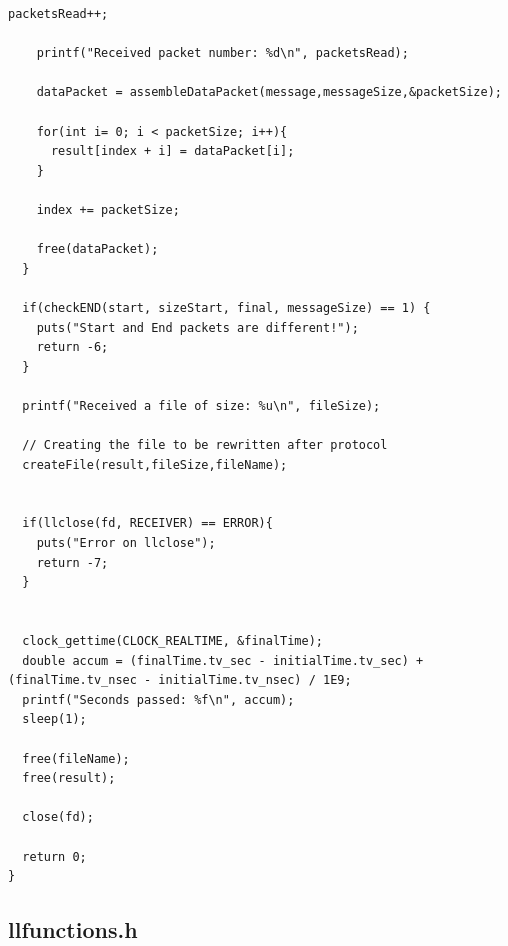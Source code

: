 \documentclass{article}
\begin{document}
\begin{lstlisting}[style=CStyle]
    packetsRead++;
    
    printf("Received packet number: %d\n", packetsRead);

    dataPacket = assembleDataPacket(message,messageSize,&packetSize);

    for(int i= 0; i < packetSize; i++){
      result[index + i] = dataPacket[i];
    }

    index += packetSize;

    free(dataPacket);
  }
  
  if(checkEND(start, sizeStart, final, messageSize) == 1) {
    puts("Start and End packets are different!");
    return -6;
  }

  printf("Received a file of size: %u\n", fileSize);

  // Creating the file to be rewritten after protocol
  createFile(result,fileSize,fileName);


  if(llclose(fd, RECEIVER) == ERROR){
    puts("Error on llclose");
    return -7;
  }


  clock_gettime(CLOCK_REALTIME, &finalTime);
  double accum = (finalTime.tv_sec - initialTime.tv_sec) + (finalTime.tv_nsec - initialTime.tv_nsec) / 1E9;
  printf("Seconds passed: %f\n", accum);
  sleep(1);

  free(fileName);
  free(result);

  close(fd);

  return 0;
}
\end{lstlisting}

\subsection{llfunctions.h}
\end{document}

